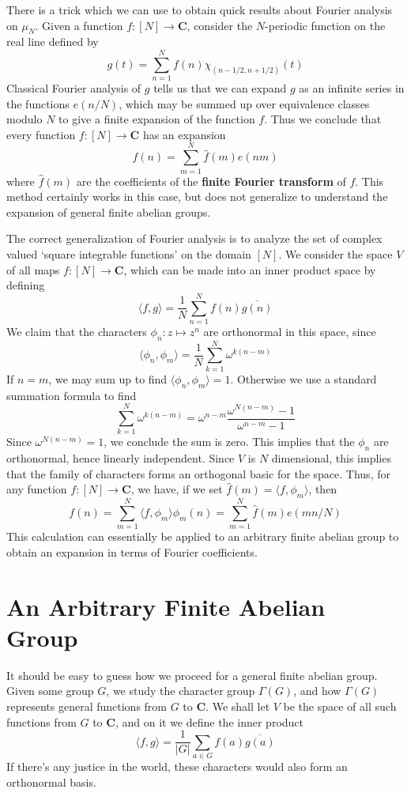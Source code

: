 There is a trick which we can use to obtain quick results about Fourier analysis on $\mu_N$. Given a function $f: [N] \to \mathbf{C}$, consider the $N$-periodic function on the real line defined by
%
\[ g(t) = \sum_{n = 1}^N f(n) \chi_{(n-1/2,n+1/2)}(t) \]
%
Classical Fourier analysis of $g$ tells us that we can expand $g$ as an infinite series in the functions $e(n/N)$, which may be summed up over equivalence classes modulo $N$ to give a finite expansion of the function $f$. Thus we conclude that every function $f: [N] \to \mathbf{C}$ has an expansion
%
\[ f(n) = \sum_{m = 1}^N \widehat{f}(m) e(nm) \]
%
where $\widehat{f}(m)$ are the coefficients of the {\bf finite Fourier transform} of $f$. This method certainly works in this case, but does not generalize to understand the expansion of general finite abelian groups.

The correct generalization of Fourier analysis is to analyze the set of complex valued `square integrable functions' on the domain $[N]$. We consider the space $V$ of all maps $f: [N] \to \mathbf{C}$, which can be made into an inner product space by defining
%
\[ \langle f, g \rangle = \frac{1}{N} \sum_{n = 1}^N f(n) \overline{g(n)} \]
%
We claim that the characters $\phi_n: z \mapsto z^n$ are orthonormal in this space, since
%
\[ \langle \phi_n, \phi_m \rangle = \frac{1}{N} \sum_{k = 1}^N \omega^{k(n-m)} \]
%
If $n = m$, we may sum up to find $\langle \phi_n, \phi_m \rangle = 1$. Otherwise we use a standard summation formula to find
%
\[ \sum_{k = 1}^N \omega^{k(n-m)} = \omega^{n-m} \frac{\omega^{N(n-m)} - 1}{\omega^{n-m} -1} \]
%
Since $\omega^{N(n-m)} = 1$, we conclude the sum is zero. This implies that the $\phi_n$ are orthonormal, hence linearly independent. Since $V$ is $N$ dimensional, this implies that the family of characters forms an orthogonal basic for the space. Thus, for any function $f: [N] \to \mathbf{C}$, we have, if we set $\widehat{f}(m) = \langle f, \phi_m \rangle$, then
%
\[ f(n) = \sum_{m = 1}^N \langle f, \phi_m \rangle \phi_m(n) = \sum_{m = 1}^N \widehat{f}(m) e(mn/N) \]
%
This calculation can essentially be applied to an arbitrary finite abelian group to obtain an expansion in terms of Fourier coefficients.

\section{An Arbitrary Finite Abelian Group}

It should be easy to guess how we proceed for a general finite abelian group. Given some group $G$, we study the character group $\Gamma(G)$, and how $\Gamma(G)$ represents general functions from $G$ to $\mathbf{C}$. We shall let $V$ be the space of all such functions from $G$ to $\mathbf{C}$, and on it we define the inner product
%
\[ \langle f, g \rangle = \frac{1}{|G|} \sum_{a \in G} f(a) \overline{g(a)} \]
%
If there's any justice in the world, these characters would also form an orthonormal basis.

